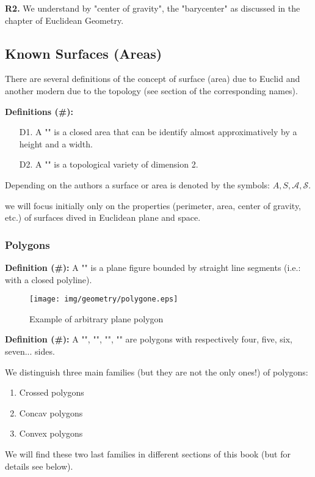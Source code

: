 {\begin{tcolorbox}[title=Remarks,colframe=black,arc=10pt]
	\textbf{R2.} We understand by "center of gravity", the "barycenter" as discussed in the chapter of Euclidean Geometry.
	\end{tcolorbox}	
	
	\subsection{Known Surfaces (Areas)}
	There are several definitions of the concept of surface (area) due to Euclid and another modern due to the topology (see section of the corresponding names).

\textbf{Definitions (\#\mydef):}
	\begin{enumerate}
		\item[D1.] A "" is a closed area that can be identify almost approximatively by a height and a width.
		\item[D2.] A "" is a topological variety of dimension 2.
	\end{enumerate}
	Depending on the authors a surface or area is denoted by the symbols: $A, S, \mathcal{A}, \mathcal{S}$.

	\begin{tcolorbox}[title=Remark,colframe=black,arc=10pt]
we will focus initially only on the properties (perimeter, area, center of gravity, etc.) of surfaces dived in Euclidean plane and space.
	\end{tcolorbox}	

	\subsubsection{Polygons}
	\textbf{Definition (\#\mydef):} A "" is a plane figure bounded by straight line segments (i.e.: with a closed polyline).

\begin{figure}[H]
\centering
\texttt{[image: img/geometry/polygone.eps]}
\caption{Example of arbitrary plane polygon}
\end{figure}

\textbf{Definition (\#\mydef):} A "", "", "", "" are polygons with respectively four, five, six, seven... sides.

We distinguish three main families (but they are not the only ones!) of polygons: 
	\begin{enumerate}
		\item Crossed polygons
		\item Concav polygons
		\item Convex polygons
	\end{enumerate}
We will find these two last families in different sections of this book (but for details see below).

}
